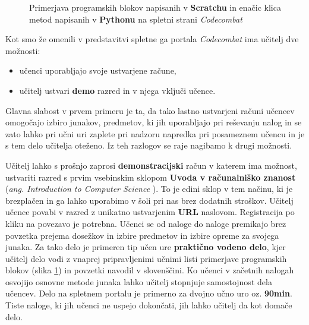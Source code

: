 \begin{figure}[h!]
    \caption{Primerjava programskih blokov napisanih v
      \textbf{Scratchu} in enačic klica metod napisanih v
      \textbf{Pythonu} na spletni strani \emph{Codecombat}}
   \label{fig:primerjava:scrVScc}
\end{figure} 

Kot smo že omenili v predstavitvi spletne ga portala \emph{Codecombat}
ima učitelj dve možnosti:

\begin{itemize}
\tightlist
\item učenci uporabljajo svoje ustvarjene račune,
\item učitelj ustvari \textbf{demo} razred in v njega vključi učence.
\end{itemize}

Glavna slabost v prvem primeru je ta, da tako lastno ustvarjeni računi
učencev omogočajo izbiro junakov, predmetov, ki jih uporabljajo pri
reševanju nalog in se zato lahko pri učni uri zaplete pri nadzoru
napredka pri posameznem učencu in je s tem delo učitelja oteženo. Iz
teh razlogov se raje nagibamo k drugi možnosti.

Učitelj lahko s prošnjo zaprosi \textbf{demonstracijski} račun v
katerem ima možnost, ustvariti razred s prvim vsebinskim sklopom
\textbf{Uvoda v računalniško znanost} (\emph{ang. Introduction to
  Computer Science }). To je edini sklop v tem načinu, ki je
brezplačen in ga lahko uporabimo v šoli pri nas brez dodatnih
stroškov. Učitelj učence povabi v razred z unikatno ustvarjenim
\textbf{URL} naslovom. Registracija po kliku na povezavo je potrebna.
Učenci se od naloge do naloge premikajo brez povzetka prejema dosežkov
in izbire predmetov in izbire opreme za svojega junaka.  Za tako delo
je primeren tip učen ure \textbf{praktično vodeno delo}, kjer učitelj
delo vodi z vnaprej pripravljenimi učnimi listi primerjave programskih
blokov (slika \ref{fig:primerjava:scrVScc}) in povzetki navodil v
slovenščini. Ko učenci v začetnih nalogah osvojijo osnovne metode
junaka lahko učitelj stopnjuje samostojnost dela učencev. Delo na
spletnem portalu je primerno za dvojno učno uro
oz. \textbf{90min}. Tiste naloge, ki jih učenci ne uspejo dokončati,
jih lahko učitelj da kot domače delo.

